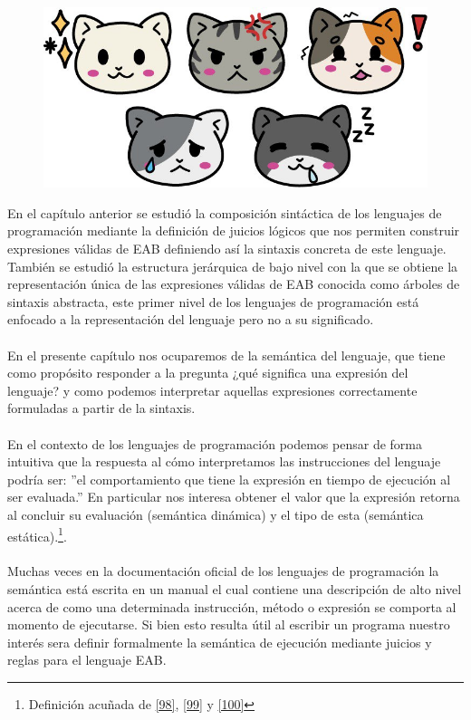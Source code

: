 
\begin{figure}[htbp]
    \centerline{\includegraphics[scale=.4]{assets/04_gatito_semantica.jpg}}       
\end{figure}


\bigskip
\bigskip
\bigskip
\bigskip


    En el capítulo anterior se estudió la composición sintáctica de los lenguajes de programación mediante la definición de juicios lógicos que nos permiten construir expresiones válidas de \textsf{EAB} definiendo así la sintaxis 
    concreta de este lenguaje. También se estudió la estructura jerárquica de bajo nivel con la que se obtiene la representación única de las expresiones válidas de \textsf{EAB} conocida como árboles de sintaxis abstracta, este primer nivel de los lenguajes de programación está enfocado a la representación del lenguaje pero no a su significado.\\\\
    En el presente capítulo nos ocuparemos de la semántica del lenguaje, que tiene como propósito responder a la pregunta ¿qué significa una expresión del lenguaje? y como podemos interpretar aquellas expresiones correctamente formuladas a partir de la sintaxis.\\\\
    En el contexto de los lenguajes de programación podemos pensar de forma intuitiva que la respuesta al cómo interpretamos las instrucciones del lenguaje podría ser: ''el comportamiento que tiene la expresión en tiempo de ejecución al ser evaluada.'' 
    En particular  nos interesa obtener el valor que la expresión retorna al concluir su evaluación (semántica dinámica) y el tipo de esta (semántica estática).\footnote{Definición acuñada de \hyperlink{98}{[98]}, \hyperlink{99}{[99]} y \hyperlink{100}{[100]}}.\\\\
    Muchas veces en la documentación oficial de los lenguajes de programación la semántica está escrita en un manual el cual contiene una descripción de alto nivel
    acerca de como una determinada instrucción, método o expresión se comporta al momento de ejecutarse. Si bien esto resulta útil al escribir un programa nuestro interés sera definir formalmente la semántica de ejecución mediante juicios y reglas para el lenguaje \textsf{EAB}. \\

